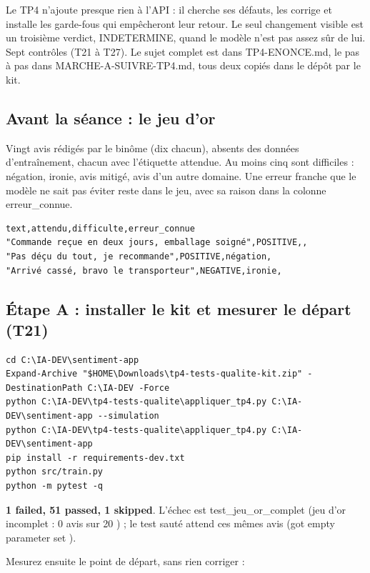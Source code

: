 \documentclass[11pt,a4paper]{article}
\newcommand{\co}[1]{{\ttfamily\hyphenchar\font=45\relax #1}}
\begin{document}
Le TP4 n'ajoute presque rien à l'API : il cherche ses défauts, les corrige et installe les garde-fous qui
empêcheront leur retour. Le seul changement visible est un troisième verdict, \co{INDETERMINE}, quand le
modèle n'est pas assez sûr de lui. Sept contrôles (T21 à T27). Le sujet complet est dans
\co{TP4-ENONCE.md}, le pas à pas dans \co{MARCHE-A-SUIVRE-TP4.md}, tous deux copiés dans le dépôt par le kit.

\subsection{Avant la séance : le jeu d'or}

Vingt avis rédigés par le binôme (dix chacun), absents des données d'entraînement, chacun avec l'étiquette
attendue. Au moins cinq sont difficiles : négation, ironie, avis mitigé, avis d'un autre domaine. Une erreur
franche que le modèle ne sait pas éviter reste dans le jeu, avec sa raison dans la colonne
\co{erreur\_connue}.

\begin{lstlisting}
text,attendu,difficulte,erreur_connue
"Commande reçue en deux jours, emballage soigné",POSITIVE,,
"Pas déçu du tout, je recommande",POSITIVE,négation,
"Arrivé cassé, bravo le transporteur",NEGATIVE,ironie,
\end{lstlisting}

\subsection{Étape A : installer le kit et mesurer le départ (T21)}

\begin{lstlisting}
cd C:\IA-DEV\sentiment-app
Expand-Archive "$HOME\Downloads\tp4-tests-qualite-kit.zip" -DestinationPath C:\IA-DEV -Force
python C:\IA-DEV\tp4-tests-qualite\appliquer_tp4.py C:\IA-DEV\sentiment-app --simulation
python C:\IA-DEV\tp4-tests-qualite\appliquer_tp4.py C:\IA-DEV\sentiment-app
pip install -r requirements-dev.txt
python src/train.py
python -m pytest -q
\end{lstlisting}

\begin{attendu}
\textbf{1 failed, 51 passed, 1 skipped}. L'échec est \co{test\_jeu\_or\_complet} (\og jeu d'or incomplet :
0 avis sur 20 \fg{}) ; le test sauté attend ces mêmes avis (\og got empty parameter set \fg{}).
\end{attendu}

Mesurez ensuite le point de départ, sans rien corriger :
\end{document}
